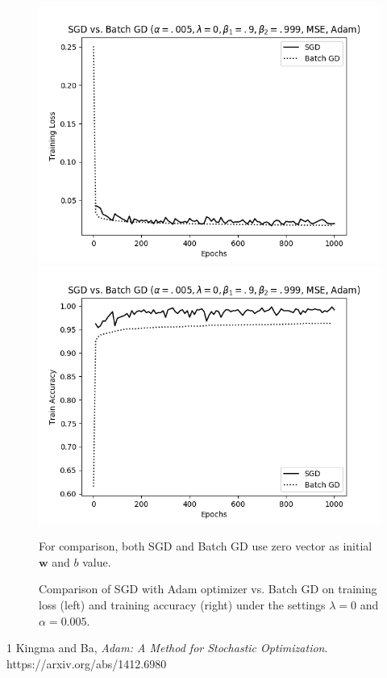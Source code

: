 \documentclass[12pt]{article}
\newenvironment{problem}[2][Problem]{\begin{trivlist}
\item[\hskip \labelsep {\bfseries #1}\hskip \labelsep {\bfseries #2.}]}{\end{trivlist}}
\begin{document}
\begin{problem}{3}
\begin{figure}[!htb]
  \includegraphics[width=\linewidth]{images/a1/3.6/adam-sgd-vs-bgd-1000epochs-loss.png}
\endminipage\hfill
{}
  \includegraphics[width=\linewidth]{images/a1/3.6/adam-sgd-vs-bgd-1000epochs-accuracy.png}
\endminipage
\caption{Comparison of SGD with Adam optimizer vs. Batch GD on training loss (left) and training accuracy (right) under the settings $\lambda=0$ and $\alpha=0.005$.}\label{fig:3-6} For comparison, both SGD and Batch GD use zero vector as initial $\textbf{w}$ and $b$ value.
\end{figure}

\end{problem}

\newpage

\begin{thebibliography}{1}
Kingma and Ba, 
\textit{Adam: A Method for Stochastic Optimization}. 
https://arxiv.org/abs/1412.6980

\end{thebibliography}
\end{document}
